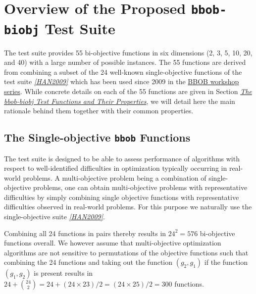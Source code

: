 \documentclass[letterpaper,12pt,english]{article}
\begin{document}
\section{Overview of the Proposed \texttt{bbob-biobj} Test Suite}
\label{index:overview-of-the-proposed-bbob-biobj-test-suite}
The  test suite provides 55 bi-objective functions in six
dimensions (2, 3, 5, 10, 20, and 40) with a large number of possible instances.
The 55 functions are derived from combining a subset of the 24 well-known
single-objective functions of the  test suite \label{index:id3}{\hyperref[index:han2009]{\emph{{[}HAN2009{]}}}} which
has been used since 2009 in the \href{http://numbbo.github.io/workshops}{BBOB workshop series}.
While concrete details on each of
the 55  functions are given in Section
{\hyperref[index:sec\string-test\string-functions]{\emph{The bbob-biobj Test Functions and Their Properties}}}, we will detail here the main rationale behind
them together with their common properties.


\subsection{The Single-objective \texttt{bbob} Functions}
\label{index:id4}\label{index:the-single-objective-bbob-functions}
The  test suite is designed to be able to assess  performance of algorithms with respect to well-identified difficulties in optimization typically  occurring in real-world problems. A multi-objective problem being a combination of single-objective problems, one can obtain multi-objective problems with representative difficulties by simply combining single objective functions with representative difficulties observed in real-world problems. For this purpose we naturally use the single-objective  suite \label{index:id5}{\hyperref[index:han2009]{\emph{{[}HAN2009{]}}}}.

Combining all 24  functions in pairs thereby results in
\(24^2=576\) bi-objective functions overall. We however assume that
multi-objective optimization algorithms are not sensitive to permutations of
the objective functions such that combining the 24   functions and
taking out the function \((g_2,g_1)\) if the function \((g_1,g_2)\)
is present results in \(24 + {24 \choose 2} = 24 + (24\times23)/2 = (24\times25)/2 = 300\) functions.
\end{document}
